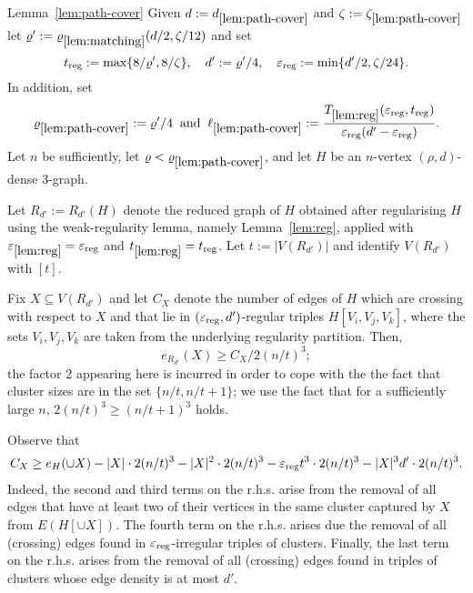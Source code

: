 \documentclass[11pt,reqno]{amsart}
\def\reg{\mathrm{reg}}
\def\matref{\mathrm{\ref{lem:matching}}}
\def\pcref{\mathrm{\ref{lem:path-cover}}}
\def\regref{\mathrm{\ref{lem:reg}}}
\begin{document}
\begin{proofof}{Lemma~\ref{lem:path-cover}}
Given $d:= d_{\pcref}$ and $\zeta := \zeta_{\pcref}$ let $\rho':= \rho_{\matref}(d/2,\zeta/12)$ and set 
\begin{equation}\label{eq:reg-cons}
t_{\reg}:= \max\{8/\rho',8/\zeta\}, \quad d' := \rho'/4, \quad \eps_{\reg} := \min\{d'/2,\zeta/24\}.
\end{equation}
In addition, set 
\begin{equation}\label{eq:cons-local}
\rho_{\pcref} := \rho'/4\; \mand \; \ell_{\pcref} := \frac{T_{\regref}(\eps_{\reg},t_{\reg})}{\eps_{\reg}(d'-\eps_{\reg})}.
\end{equation}
Let $n$ be sufficiently, let $\rho < \rho_{\pcref}$, and let $H$ be an $n$-vertex $(\rho,d)$-dense $3$-graph. 

Let $R_{d'} :=R_{d'}(H)$ denote the reduced graph of $H$ obtained after regularising $H$  using the weak-regularity lemma, namely Lemma~\ref{lem:reg}, applied with $\eps_{\regref}=\eps_{\reg}$ and $t_{\regref} = t_{\reg}$. Let $t:=|V(R_{d'})|$ and identify $V(R_{d'})$ with $[t]$.

\begin{claim}\label{clm:rd-dense}
\end{claim}

\begin{innerproof} Fix $X \subseteq V(R_{d'})$ and let $C_X$ denote the number of edges of $H$ which are crossing with respect to $X$ and that lie in $(\eps_{\reg},d')$-regular triples $H[V_i, V_j, V_k]$, where the sets $V_i,V_j,V_k$ are taken from the underlying regularity partition. Then, 
$$
e_{R_{d'}}(X) \geq C_X/2(n/t)^3;
$$ 
the factor $2$ appearing here is incurred in order to cope with the the fact that cluster sizes are in the set $\{n/t,n/t+1\}$; we use the fact that for a sufficiently large $n$, $2(n/t)^3 \geq (n/t+1)^3$ holds. 

Observe that 
\begin{align*}
C_X \geq e_H(\cup X) - |X| \cdot 2(n/t)^3 - |X|^2\cdot  2(n/t)^3 -\eps_{\reg} t^3 \cdot 2(n/t)^3-|X|^3 d' \cdot 2(n/t)^3.
\end{align*}
Indeed, the second and third terms on the r.h.s. arise from the removal of all edges that have at least two of their vertices in the same cluster captured by $X$ from $E(H[\cup X])$. The fourth term on the r.h.s. arises due the removal of  all (crossing) edges found in $\eps_{\reg}$-irregular triples of clusters. Finally, the last term on the r.h.s. arises from the removal of all (crossing) edges found in triples of clusters whose edge density is at most $d'$. 


\end{innerproof}
\end{proofof}
\end{document}
